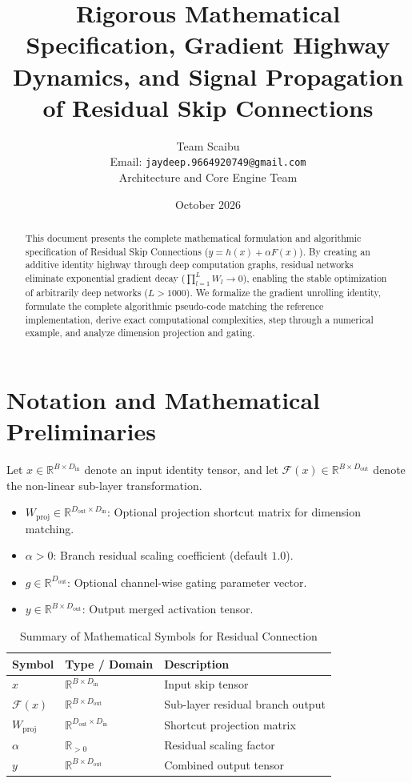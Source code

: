 \documentclass[11pt,a4paper]{article}
\title{\textbf{Rigorous Mathematical Specification, Gradient Highway Dynamics, and Signal Propagation of Residual Skip Connections}}
\author{Team Scaibu \\ \small Email: \texttt{jaydeep.9664920749@gmail.com} \\ \small Architecture and Core Engine Team}
\date{October 2026}
\theoremstyle{definition}
\begin{document}
\maketitle

\begin{abstract}
This document presents the complete mathematical formulation and algorithmic specification of Residual Skip Connections ($y = h(x) + \alpha F(x)$). By creating an additive identity highway through deep computation graphs, residual networks eliminate exponential gradient decay ($\prod_{l=1}^L W_l \to 0$), enabling the stable optimization of arbitrarily deep networks ($L > 1000$). We formalize the gradient unrolling identity, formulate the complete algorithmic pseudo-code matching the reference implementation, derive exact computational complexities, step through a numerical example, and analyze dimension projection and gating.
\end{abstract}

\section{Notation and Mathematical Preliminaries}

Let $x \in \mathbb{R}^{B \times D_{\text{in}}}$ denote an input identity tensor, and let $\mathcal{F}(x) \in \mathbb{R}^{B \times D_{\text{out}}}$ denote the non-linear sub-layer transformation.

\begin{itemize}
    \item $W_{\text{proj}} \in \mathbb{R}^{D_{\text{out}} \times D_{\text{in}}}$: Optional projection shortcut matrix for dimension matching.
    \item $\alpha > 0$: Branch residual scaling coefficient (default $1.0$).
    \item $g \in \mathbb{R}^{D_{\text{out}}}$: Optional channel-wise gating parameter vector.
    \item $y \in \mathbb{R}^{B \times D_{\text{out}}}$: Output merged activation tensor.
\end{itemize}

\begin{table}[h]
\centering
\caption{Summary of Mathematical Symbols for Residual Connection}
\begin{tabular}{lll}
\toprule
\textbf{Symbol} & \textbf{Type / Domain} & \textbf{Description} \\
\midrule
$x$ & $\mathbb{R}^{B \times D_{\text{in}}}$ & Input skip tensor \\
$\mathcal{F}(x)$ & $\mathbb{R}^{B \times D_{\text{out}}}$ & Sub-layer residual branch output \\
$W_{\text{proj}}$ & $\mathbb{R}^{D_{\text{out}} \times D_{\text{in}}}$ & Shortcut projection matrix \\
$\alpha$ & $\mathbb{R}_{> 0}$ & Residual scaling factor \\
$y$ & $\mathbb{R}^{B \times D_{\text{out}}}$ & Combined output tensor \\
\bottomrule
\end{tabular}
\end{table}
\end{document}
